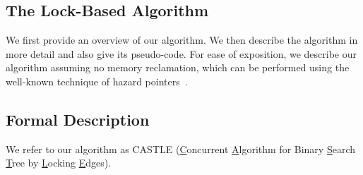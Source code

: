 \begin{limitscope}
\newcommand{\accesspath}{access-path}
\newcommand{\terminalnode}{terminal node}

\newcommand{\true}{\textsf{true}}
\newcommand{\false}{\textsf{false}}

\newcommand{\CAS}{\textsf{CAS}}

\newcommand{\sNodeOne}{\mathbb{R}}
\newcommand{\sNodeTwo}{\mathbb{S}}
\newcommand{\sKeyOne}{\infty_1}
\newcommand{\sKeyTwo}{\infty_2}

\newcommand{\targetnode}{target node}
\newcommand{\anchornode}{anchor node}

\newcommand{\myparent}{parent}
\newcommand{\myleft}{le\!f\!t}
\newcommand{\myright}{right}

\newcommand{\CASTLE}{\textsc{CASTLE}}
\newcommand{\CITRUS}{\textsc{CITRUS}}
\newcommand{\HJBST}{\textsc{LF-IBST}}
\newcommand{\NMBST}{\textsc{LF-EBST}}

\newcommand{\RemoveChild}{\textsc{RemoveChild}}
\newcommand{\LockAll}{\textsc{LockAll}}
\newcommand{\UnlockAll}{\textsc{UnlockAll}}
\newcommand{\ClearFlags}{\textsc{ClearFlags}}
\newcommand{\FindSmallest}{\textsc{FindSmallest}}

\newcommand{\lFlag}{lFlag}
\newcommand{\mFlag}{mFlag}
\newcommand{\nFlag}{nFlag}


\section{The Lock-Based Algorithm}
\label{sec:castle-algorithm}
We first provide an overview of our algorithm. We then describe the algorithm in more detail and also give its pseudo-code. For ease of exposition, we describe our algorithm assuming no memory reclamation, which can be performed using the well-known technique of hazard pointers~\cite{Mic:2004:TPDS}.





\subsection{Formal Description}

We refer to our algorithm as \CASTLE{} (\underline{C}oncurrent \underline{A}lgorithm for Binary \underline{S}earch \underline{T}ree by \underline{L}ocking \underline{E}dges). 


\end{limitscope}
